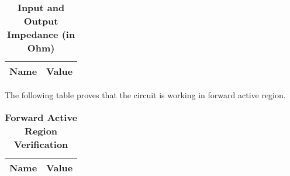 \begin{table}[H]
\centering
\begin{tabular}{|l|l|}
\hline
{\bf Name} & {\bf Value} \\ \hline
    
    
\end{tabular}
\caption{\textbf{Input and Output Impedance (in Ohm) }}
\end{table}

The following table proves that the circuit is working in forward active region.

\begin{table}[H]
\centering
\begin{tabular}{|l|l|}
\hline
{\bf Name} & {\bf Value} \\ \hline
    
\end{tabular}
\caption{\textbf{Forward Active Region Verification}}
\end{table}

